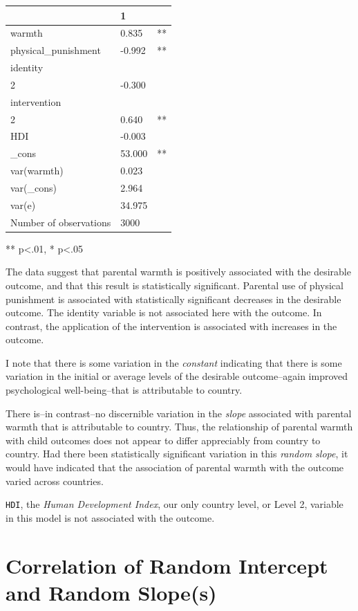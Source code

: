 \documentclass[
  letterpaper,
  DIV=11,
  numbers=noendperiod]{scrreprt}
\begin{document}
\begin{longtable}[]{@{}lll@{}}
\toprule\noalign{}
& 1 & \\
\midrule\noalign{}
\endhead
\bottomrule\noalign{}
\endlastfoot
warmth & 0.835 & ** \\
physical\_punishment & -0.992 & ** \\
identity & & \\
2 & -0.300 & \\
intervention & & \\
2 & 0.640 & ** \\
HDI & -0.003 & \\
\_cons & 53.000 & ** \\
var(warmth) & 0.023 & \\
var(\_cons) & 2.964 & \\
var(e) & 34.975 & \\
Number of observations & 3000 & \\
\end{longtable}

** p\textless.01, * p\textless.05

The data suggest that parental warmth is positively associated with the
desirable outcome, and that this result is statistically significant.
Parental use of physical punishment is associated with statistically
significant decreases in the desirable outcome. The identity variable is
not associated here with the outcome. In contrast, the application of
the intervention is associated with increases in the outcome.

I note that there is some variation in the \emph{constant} indicating
that there is some variation in the initial or average levels of the
desirable outcome--again improved psychological well-being--that is
attributable to country.

There is--in contrast--no discernible variation in the \emph{slope}
associated with parental warmth that is attributable to country. Thus,
the relationship of parental warmth with child outcomes does not appear
to differ appreciably from country to country. Had there been
statistically significant variation in this \emph{random slope}, it
would have indicated that the association of parental warmth with the
outcome varied across countries.

\texttt{HDI}, the \emph{Human Development Index}, our only country
level, or Level 2, variable in this model is not associated with the
outcome.

\section{Correlation of Random Intercept and Random
Slope(s)}\label{correlation-of-random-intercept-and-random-slopes}
\end{document}
